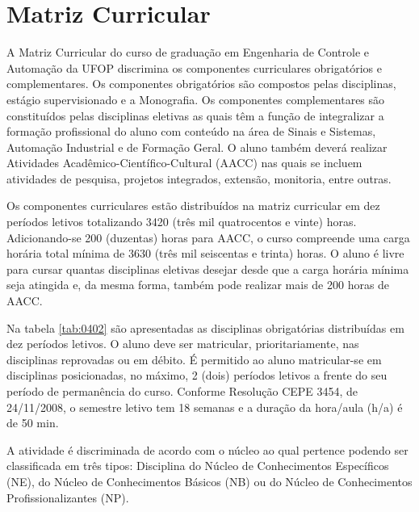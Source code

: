 \section{Matriz Curricular} \label{sec:matriz}

A Matriz Curricular do curso de graduação em Engenharia de Controle e Automação da UFOP discrimina os componentes curriculares obrigatórios e complementares. Os componentes obrigatórios são compostos pelas disciplinas, estágio supervisionado e a Monografia. Os componentes complementares são constituídos pelas disciplinas eletivas as quais têm a função de integralizar a formação profissional do aluno com conteúdo na área de Sinais e Sistemas, Automação Industrial e de Formação Geral. O aluno também deverá realizar Atividades Acadêmico-Científico-Cultural (AACC) nas quais se incluem atividades de pesquisa, projetos integrados, extensão, monitoria, entre outras.

Os componentes curriculares estão distribuídos na matriz curricular em dez períodos letivos totalizando 3420 (três mil quatrocentos e vinte) horas. Adicionando-se 200 (duzentas) horas para AACC, o curso compreende uma carga horária total mínima de 3630 (três mil seiscentas e trinta) horas. O aluno é livre para cursar quantas disciplinas eletivas desejar desde que a carga horária mínima seja atingida e, da mesma forma, também pode realizar mais de 200 horas de AACC.  

Na tabela \ref{tab:0402} são apresentadas as disciplinas obrigatórias distribuídas em dez períodos letivos. O aluno deve ser matricular, prioritariamente, nas disciplinas reprovadas ou em débito. É permitido ao aluno matricular-se em disciplinas posicionadas, no máximo, 2 (dois) períodos letivos a frente do seu período de permanência do curso. 
Conforme Resolução CEPE 3454, de 24/11/2008, o semestre letivo tem 18 semanas e a duração da hora/aula (h/a) é de 50 min.

A atividade é discriminada de acordo com o núcleo ao qual pertence podendo ser classificada em três tipos: Disciplina do Núcleo de Conhecimentos Específicos (NE), do Núcleo de Conhecimentos Básicos (NB) ou do Núcleo de Conhecimentos Profissionalizantes (NP). 


